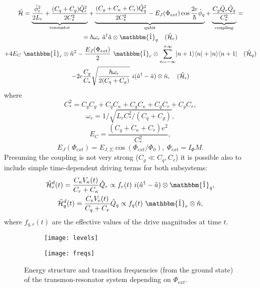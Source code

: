 \documentclass[12pt, twoside]{report}
\DeclarePairedDelimiter\bra{\langle}{\rvert}
\DeclarePairedDelimiter\ket{\lvert}{\rangle}
\numberwithin{equation}{section}
\begin{document}
\begin{equation}
\begin{gathered}
\mathcal{\hat H} =  \underbrace{\frac{\hat \phi_r^2}{2 L_r} + \frac{(C_q+C_g) \hat Q_r^2}{2C_*^2}}_\text{resonator} 
+ \underbrace{\frac{(C_g + C_\kappa + C_r) \hat Q^2_q}{2C_*^2} - E_J (\Phi_{ext}) \cos \frac{2e}{\hbar}\hat \phi_q }_\text{qubit}
+ \underbrace{\frac{C_g\hat Q_r \hat Q_q}{C_*^2}}_\text{coupling} = \\
=  \hbar\omega_r\ \hat a^\dag \hat a \otimes \mathbbm{\hat 1}_q \quad (\mathcal{\hat H}_r) \\
+ 4 E_C\ \mathbbm{\hat 1}_r \otimes \hat n^2 - \frac{E_J(\Phi_{ext})}{2}\ \mathbbm{\hat 1}_r\otimes \sum_{n=-\infty}^{+\infty} \ket{n+1}\bra{n} + \ket{n}\bra{n+1} \quad (\mathcal{\hat H}_q) \\
- 2e \frac{C_g}{C_*} \sqrt{\frac{\hbar \omega_r }{2(C_q+C_g)}}\ i(\hat a^\dag - \hat a) \otimes \hat n, \quad (\mathcal{\hat H}_i)
\end{gathered}\label{eq:hamiltonian}
\end{equation}
where 
$$C_*^2 = C_q C_g + C_q C_\kappa + C_g C_\kappa + C_q C_r + C_g C_r, $$
$$\omega_r = 1/\sqrt{L_r C_*^2/(C_q+C_g)}, $$
$$E_C = \frac{(C_g+C_\kappa+C_r)e^2}{C_*^2}, $$
$$E_J(\Phi_{ext}) = E_{J,\Sigma} \cos(\Phi_{ext}/\Phi_0),\ \Phi_{ext} = I_\Phi M.$$
Presuming the coupling is not very strong ($C_g \ll C_q, C_r$) it is possible also to include simple time-dependent driving terms for both subsystems:
\begin{gather}
\mathcal{\hat H}_r^d(t) = \frac{C_\kappa V_\kappa(t)}{C_r + C_\kappa} \hat Q_r \propto f_r(t)\ i(\hat a^\dag - \hat a) \otimes \mathbbm{\hat 1}_q, \notag \\
\mathcal{\hat H}_q^d(t) = \frac{C_e V_e(t)}{C_q + C_e} \hat Q_q \propto f_q(t)\  \mathbbm{\hat 1}_r \otimes \hat n,
\label{eq:driving_q}
\end{gather}
where $f_{q, r} (t)$ are the effective values of the drive magnitudes at time $t$.

\begin{figure}
\centering
\begin{subfigure}[t]{\textwidth}
\centering
\texttt{[image: levels]}
\end{subfigure}

\begin{subfigure}[t]{\textwidth}
\centering
\texttt{[image: freqs]}
\end{subfigure}
\caption{Energy structure and transition frequencies (from the ground state) of the transmon-resonator system depending on $\Phi_{ext}$.}
\label{fig:levels}
\end{figure}
\end{document}
